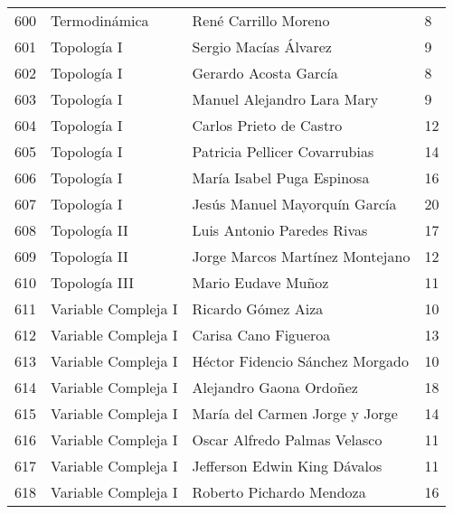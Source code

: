 \begin{table}[ht]
\begin{tabular}{rlll}
  600 & Termodinámica & René Carrillo Moreno & 8 \\ 
  601 & Topología I & Sergio Macías Álvarez & 9 \\ 
  602 & Topología I & Gerardo Acosta García & 8 \\ 
  603 & Topología I & Manuel Alejandro Lara Mary & 9 \\ 
  604 & Topología I & Carlos Prieto de Castro & 12 \\ 
  605 & Topología I & Patricia Pellicer Covarrubias & 14 \\ 
  606 & Topología I & María Isabel Puga Espinosa & 16 \\ 
  607 & Topología I & Jesús Manuel Mayorquín García & 20 \\ 
  608 & Topología II & Luis Antonio Paredes Rivas & 17 \\ 
  609 & Topología II & Jorge Marcos Martínez Montejano & 12 \\ 
  610 & Topología III & Mario Eudave Muñoz & 11 \\ 
  611 & Variable Compleja I & Ricardo Gómez Aiza & 10 \\ 
  612 & Variable Compleja I & Carisa Cano Figueroa & 13 \\ 
  613 & Variable Compleja I & Héctor Fidencio Sánchez Morgado & 10 \\ 
  614 & Variable Compleja I & Alejandro Gaona Ordoñez & 18 \\ 
  615 & Variable Compleja I & María del Carmen Jorge y Jorge & 14 \\ 
  616 & Variable Compleja I & Oscar Alfredo Palmas Velasco & 11 \\ 
  617 & Variable Compleja I & Jefferson Edwin King Dávalos & 11 \\ 
  618 & Variable Compleja I & Roberto Pichardo Mendoza & 16 \\ 
   \hline
\end{tabular}
\end{table}



